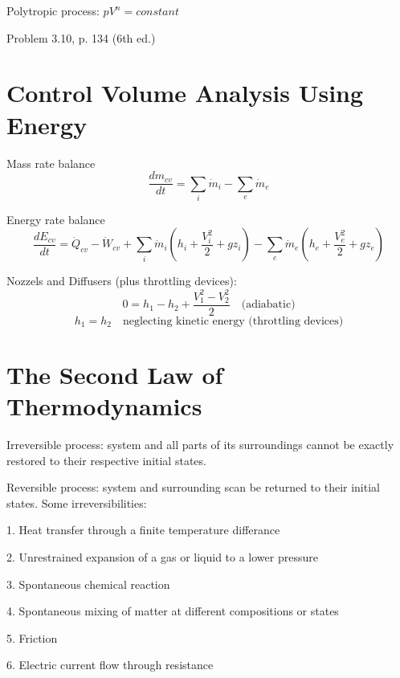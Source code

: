 \documentclass[paper=letter, fontsize=11pt]{scrartcl}
\numberwithin{equation}{section}        %
\numberwithin{figure}{section}          %
\numberwithin{table}{section}               %
\begin{document}
Polytropic process: $pV^n=constant$

Problem 3.10, p. 134 (6th ed.)


\newpage
\section{Control Volume Analysis Using Energy}

Mass rate balance
\begin{equation}
    \frac{dm_{cv}}{dt} = \sum_i \dot m_i - \sum_e \dot m_e
\end{equation}

Energy rate balance
\begin{equation}
    \frac{dE_{cv}}{dt} = \dot Q_{cv} -  \dot W_{cv} + \sum_i \dot m_i \left(h_i + \frac{V_i^2}{2} + gz_i \right) - \sum_e \dot m_e \left(h_e + \frac{V_e^2}{2} + gz_e \right) 
\end{equation}

Nozzels and Diffusers (plus throttling devices):
\begin{equation}
    0 = h_1 - h_2 + \frac{V_1^2 - V_2^2}{2}\quad\text{(adiabatic)}
\end{equation}
\begin{equation}
    h_1 = h_2\quad\text{neglecting kinetic energy (throttling devices)}
\end{equation}


\newpage
\section{The Second Law of Thermodynamics}

Irreversible process: system and all parts of its surroundings cannot be exactly restored to their respective initial states.

Reversible process: system and surrounding scan be returned to their initial states.
\newline
\newline
Some irreversibilities:

1. Heat transfer through a finite temperature differance

2. Unrestrained expansion of a gas or liquid to a lower pressure

3. Spontaneous chemical reaction

4. Spontaneous mixing of matter at different compositions or states

5. Friction

6. Electric current flow through resistance
\end{document}
